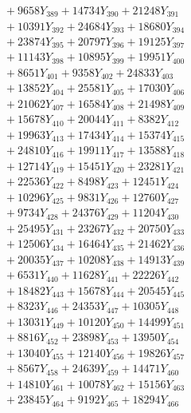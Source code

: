 \documentclass[a4paper,10pt]{article}
\begin{document}
{\begin{align}
&\;  + 9658 Y_{389} + 14734 Y_{390} + 21248 Y_{391} \\[0.3ex]
&\;  + 10391 Y_{392} + 24684 Y_{393} + 18680 Y_{394} \\[0.3ex]
&\;  + 23874 Y_{395} + 20797 Y_{396} + 19125 Y_{397} \\[0.3ex]
&\;  + 11143 Y_{398} + 10895 Y_{399} + 19951 Y_{400} \\[0.3ex]
&\;  + 8651 Y_{401} + 9358 Y_{402} + 24833 Y_{403} \\[0.3ex]
&\;  + 13852 Y_{404} + 25581 Y_{405} + 17030 Y_{406} \\[0.3ex]
&\;  + 21062 Y_{407} + 16584 Y_{408} + 21498 Y_{409} \\[0.3ex]
&\;  + 15678 Y_{410} + 20044 Y_{411} + 8382 Y_{412} \\[0.3ex]
&\;  + 19963 Y_{413} + 17434 Y_{414} + 15374 Y_{415} \\[0.3ex]
&\;  + 24810 Y_{416} + 19911 Y_{417} + 13588 Y_{418} \\[0.5ex]\allowbreak
&\;  + 12714 Y_{419} + 15451 Y_{420} + 23281 Y_{421} \\[0.3ex]
&\;  + 22536 Y_{422} + 8498 Y_{423} + 12451 Y_{424} \\[0.3ex]
&\;  + 10296 Y_{425} + 9831 Y_{426} + 12760 Y_{427} \\[0.3ex]
&\;  + 9734 Y_{428} + 24376 Y_{429} + 11204 Y_{430} \\[0.3ex]
&\;  + 25495 Y_{431} + 23267 Y_{432} + 20750 Y_{433} \\[0.3ex]
&\;  + 12506 Y_{434} + 16464 Y_{435} + 21462 Y_{436} \\[0.3ex]
&\;  + 20035 Y_{437} + 10208 Y_{438} + 14913 Y_{439} \\[0.3ex]
&\;  + 6531 Y_{440} + 11628 Y_{441} + 22226 Y_{442} \\[0.3ex]
&\;  + 18482 Y_{443} + 15678 Y_{444} + 20545 Y_{445} \\[0.3ex]
&\;  + 8323 Y_{446} + 24353 Y_{447} + 10305 Y_{448} \\[0.5ex]\allowbreak
&\;  + 13031 Y_{449} + 10120 Y_{450} + 14499 Y_{451} \\[0.3ex]
&\;  + 8816 Y_{452} + 23898 Y_{453} + 13950 Y_{454} \\[0.3ex]
&\;  + 13040 Y_{455} + 12140 Y_{456} + 19826 Y_{457} \\[0.3ex]
&\;  + 8567 Y_{458} + 24639 Y_{459} + 14471 Y_{460} \\[0.3ex]
&\;  + 14810 Y_{461} + 10078 Y_{462} + 15156 Y_{463} \\[0.3ex]
&\;  + 23845 Y_{464} + 9192 Y_{465} + 18294 Y_{466} \\[0.3ex]

\end{align}}
\end{document}
